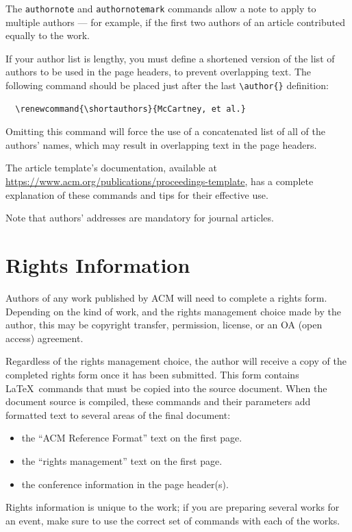 \documentclass[manuscript,screen,review]{acmart}
\begin{document}
The \verb|authornote| and \verb|authornotemark| commands allow a note
to apply to multiple authors --- for example, if the first two authors
of an article contributed equally to the work.

If your author list is lengthy, you must define a shortened version of
the list of authors to be used in the page headers, to prevent
overlapping text. The following command should be placed just after
the last \verb|\author{}| definition:
\begin{verbatim}
  \renewcommand{\shortauthors}{McCartney, et al.}
\end{verbatim}
Omitting this command will force the use of a concatenated list of all
of the authors' names, which may result in overlapping text in the
page headers.

The article template's documentation, available at
\url{https://www.acm.org/publications/proceedings-template}, has a
complete explanation of these commands and tips for their effective
use.

Note that authors' addresses are mandatory for journal articles.

\section{Rights Information}

Authors of any work published by ACM will need to complete a rights
form. Depending on the kind of work, and the rights management choice
made by the author, this may be copyright transfer, permission,
license, or an OA (open access) agreement.

Regardless of the rights management choice, the author will receive a
copy of the completed rights form once it has been submitted. This
form contains \LaTeX\ commands that must be copied into the source
document. When the document source is compiled, these commands and
their parameters add formatted text to several areas of the final
document:
\begin{itemize}
\item the ``ACM Reference Format'' text on the first page.
\item the ``rights management'' text on the first page.
\item the conference information in the page header(s).
\end{itemize}

Rights information is unique to the work; if you are preparing several
works for an event, make sure to use the correct set of commands with
each of the works.
\end{document}
